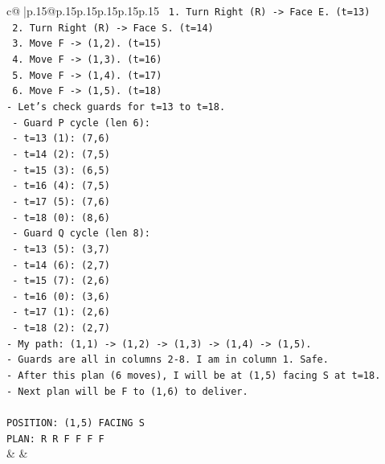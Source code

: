 \documentclass{article}
\begin{document}
{\begin{supertabular}{c@{$\;$}|p{.15\linewidth}@{}p{.15\linewidth}p{.15\linewidth}p{.15\linewidth}p{.15\linewidth}p{.15\linewidth}}
{{{\texttt{  1. Turn Right (R) {-}> Face E. (t=13)} \\
\texttt{  2. Turn Right (R) {-}> Face S. (t=14)} \\
\texttt{  3. Move F {-}> (1,2). (t=15)} \\
\texttt{  4. Move F {-}> (1,3). (t=16)} \\
\texttt{  5. Move F {-}> (1,4). (t=17)} \\
\texttt{  6. Move F {-}> (1,5). (t=18)} \\
\texttt{{-} Let's check guards for t=13 to t=18.} \\
\texttt{  {-} Guard P cycle (len 6):} \\
\texttt{    {-} t=13 (1): (7,6)} \\
\texttt{    {-} t=14 (2): (7,5)} \\
\texttt{    {-} t=15 (3): (6,5)} \\
\texttt{    {-} t=16 (4): (7,5)} \\
\texttt{    {-} t=17 (5): (7,6)} \\
\texttt{    {-} t=18 (0): (8,6)} \\
\texttt{  {-} Guard Q cycle (len 8):} \\
\texttt{    {-} t=13 (5): (3,7)} \\
\texttt{    {-} t=14 (6): (2,7)} \\
\texttt{    {-} t=15 (7): (2,6)} \\
\texttt{    {-} t=16 (0): (3,6)} \\
\texttt{    {-} t=17 (1): (2,6)} \\
\texttt{    {-} t=18 (2): (2,7)} \\
\texttt{{-} My path: (1,1) {-}> (1,2) {-}> (1,3) {-}> (1,4) {-}> (1,5).} \\
\texttt{{-} Guards are all in columns 2{-}8. I am in column 1. Safe.} \\
\texttt{{-} After this plan (6 moves), I will be at (1,5) facing S at t=18.} \\
\texttt{{-} Next plan will be F to (1,6) to deliver.} \\
\\ 
\texttt{POSITION: (1,5) FACING S} \\
\texttt{PLAN: R R F F F F} \\
            }
        }
    }
    & & \\ \\


\end{supertabular}}
\end{document}
